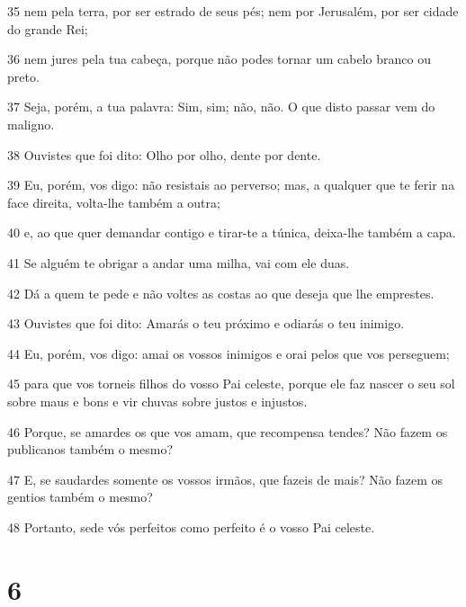 \par 35 nem pela terra, por ser estrado de seus pés; nem por Jerusalém, por ser cidade do grande Rei;
\par 36 nem jures pela tua cabeça, porque não podes tornar um cabelo branco ou preto.
\par 37 Seja, porém, a tua palavra: Sim, sim; não, não. O que disto passar vem do maligno.
\par 38 Ouvistes que foi dito: Olho por olho, dente por dente.
\par 39 Eu, porém, vos digo: não resistais ao perverso; mas, a qualquer que te ferir na face direita, volta-lhe também a outra;
\par 40 e, ao que quer demandar contigo e tirar-te a túnica, deixa-lhe também a capa.
\par 41 Se alguém te obrigar a andar uma milha, vai com ele duas.
\par 42 Dá a quem te pede e não voltes as costas ao que deseja que lhe emprestes.
\par 43 Ouvistes que foi dito: Amarás o teu próximo e odiarás o teu inimigo.
\par 44 Eu, porém, vos digo: amai os vossos inimigos e orai pelos que vos perseguem;
\par 45 para que vos torneis filhos do vosso Pai celeste, porque ele faz nascer o seu sol sobre maus e bons e vir chuvas sobre justos e injustos.
\par 46 Porque, se amardes os que vos amam, que recompensa tendes? Não fazem os publicanos também o mesmo?
\par 47 E, se saudardes somente os vossos irmãos, que fazeis de mais? Não fazem os gentios também o mesmo?
\par 48 Portanto, sede vós perfeitos como perfeito é o vosso Pai celeste.

\chapter{6}

